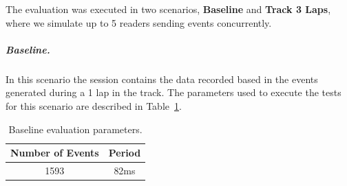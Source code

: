 The evaluation was executed in two scenarios, \textbf{Baseline} and \textbf{Track 3 Laps}, where we
simulate up to 5 readers sending events concurrently.

\subparagraph{Baseline.}
\label{subp:eval_exp_data_baseline}
In this scenario the session contains the data recorded based in the events generated during a 1 lap
in the track. The parameters used to execute the tests for this scenario are described in Table~\ref{tab:baseline_parameters}.

\begin{table}[ht!]
  \begin{tabular}{|c|c|}
    \hline
    Number of Events & Period \\ \hline
    1593             & 82ms   \\ \hline
  \end{tabular}
  \caption{Baseline evaluation parameters.}
  \label{tab:baseline_parameters}
\end{table}

